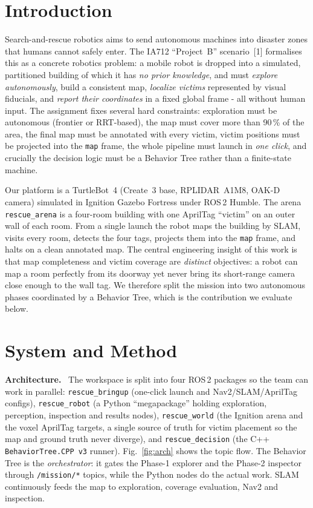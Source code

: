 \documentclass[10pt,twocolumn,a4paper]{article}
\newcommand{\head}[1]{\par\smallskip\noindent\textbf{\color{nccblue}#1}\ \ignorespaces}
\begin{document}
\section{Introduction}
Search-and-rescue robotics aims to send autonomous machines into disaster zones that humans cannot
safely enter. The IA712 ``Project~B'' scenario~[1] formalises this as a concrete robotics problem: a
mobile robot is dropped into a simulated, partitioned building of which it has \emph{no prior knowledge},
and must \emph{explore autonomously}, build a consistent map, \emph{localize victims} represented by
visual fiducials, and \emph{report their coordinates} in a fixed global frame - all without human
input. The assignment fixes several hard constraints: exploration must be autonomous (frontier or
RRT-based), the map must cover more than 90\,\% of the area, the final map must be annotated with every
victim, victim positions must be projected into the \texttt{map} frame, the whole pipeline must launch in
\emph{one click}, and crucially the decision logic must be a Behavior Tree rather than a finite-state
machine.

Our platform is a TurtleBot~4 (Create~3 base, RPLIDAR~A1M8, OAK-D camera) simulated in Ignition Gazebo
Fortress under ROS\,2 Humble. The arena \texttt{rescue\_arena} is a four-room building with one AprilTag
``victim'' on an outer wall of each room. From a single launch the robot maps the building by SLAM,
visits every room, detects the four tags, projects them into the \texttt{map} frame, and halts on a clean
annotated map. The central engineering insight of this work is that map completeness and victim coverage
are \emph{distinct} objectives: a robot can map a room perfectly from its doorway yet never bring its
short-range camera close enough to the wall tag. We therefore split the mission into two autonomous
phases coordinated by a Behavior Tree, which is the contribution we evaluate below.

\section{System and Method}
\head{Architecture.} The workspace is split into four ROS\,2 packages so the team can work in parallel:
\texttt{rescue\_bringup} (one-click launch and Nav2/SLAM/AprilTag configs), \texttt{rescue\_robot} (a
Python ``megapackage'' holding exploration, perception, inspection and results nodes),
\texttt{rescue\_world} (the Ignition arena and the voxel AprilTag targets, a single source of truth for
victim placement so the map and ground truth never diverge), and \texttt{rescue\_decision} (the C++
\texttt{BehaviorTree.CPP\,v3} runner). Fig.~\ref{fig:arch} shows the topic flow. The Behavior Tree is the
\emph{orchestrator}: it gates the Phase-1 explorer and the Phase-2 inspector through \texttt{/mission/*}
topics, while the Python nodes do the actual work. SLAM continuously feeds the map to exploration,
coverage evaluation, Nav2 and inspection.
\end{document}
